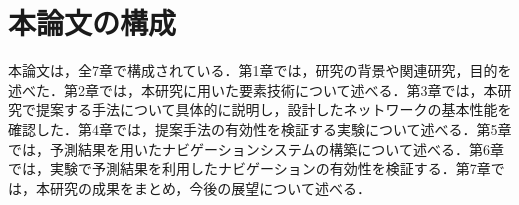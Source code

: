 
\section{本論文の構成}
本論文は，全7章で構成されている．第1章では，研究の背景や関連研究，目的を述べた．第2章では，本研究に用いた要素技術について述べる．第3章では，本研究で提案する手法について具体的に説明し，設計したネットワークの基本性能を確認した．第4章では，提案手法の有効性を検証する実験について述べる．第5章では，予測結果を用いたナビゲーションシステムの構築について述べる．第6章では，実験で予測結果を利用したナビゲーションの有効性を検証する．第7章では，本研究の成果をまとめ，今後の展望について述べる．

\newpage
